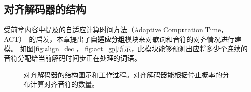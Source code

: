 \subsection{对齐解码器的结构}
受前章内容中提及的自适应计算时间方法（Adaptive Computation Time，ACT）~\citep{act}的启发，本章提出了\textbf{自适应分组}模块来对歌词和音符的对齐情况进行建模。
如图\ref{fig:align_dec}，\ref{fig:act_gp}所示，此模块能够预测出应将多少个连续的音符分配给当前解码时间步正在处理的词语。
\begin{figure}
  \caption{对齐解码器的结构图示和工作过程。对齐解码器能根据停止概率的分布计算对齐音符的数量。}
\end{figure}
